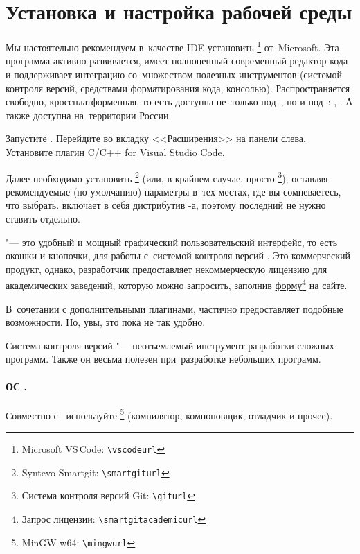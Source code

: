 \section{Установка и настройка рабочей среды}\label{sect:workEnv}
Мы настоятельно рекомендуем в~качестве IDE установить \href{\vscodeurl}{}\footnote{\textenglish{Microsoft VS\,Code:} \nolinkurl{\vscodeurl}} от~Microsoft. Эта программа активно развивается, имеет полноценный современный редактор кода и поддерживает интеграцию со~множеством полезных инструментов (системой контроля версий, средствами форматирования кода, консолью). Распространяется свободно, кроссплатформенная, то есть доступна не~только под~, но и под~: , . А также доступна на~территории России.

Запустите . Перейдите во вкладку <<Расширения>> на панели слева. Установите плагин \textenglish{C/C++ for Visual Studio Code}.

Далее необходимо установить \href{\smartgiturl}{}\footnote{Syntevo Smartgit: \nolinkurl{\smartgiturl}} (или, в крайнем случае, просто \href{\giturl}{\git}\footnote{Система контроля версий Git: \nolinkurl{\giturl}}), оставляя рекомендуемые (по умолчанию) параметры в~тех местах, где вы сомневаетесь, что выбрать.  включает в себя дистрибутив \git-а, поэтому последний не нужно ставить отдельно.

 "--- это удобный и мощный графический пользовательский интерфейс, то есть окошки и кнопочки, для работы с~системой контроля версий \git. Это коммерческий продукт, однако, разработчик предоставляет некоммерческую лицензию для академических заведений, которую можно запросить, заполнив \href{\smartgitacademicurl}{форму}\footnote{Запрос лицензии: \nolinkurl{\smartgitacademicurl}} на сайте.

В~сочетании с дополнительными плагинами,  частично предоставляет подобные возможности. Но, увы, это пока не так удобно.

Система контроля версий "--- неотъемлемый инструмент разработки сложных программ. Также он весьма полезен при~разработке небольших программ.



\paragraph{ОС .}
Совместно с~ используйте \href{\mingwurl}{}\footnote{MinGW-w64: \nolinkurl{\mingwurl}} (компилятор, компоновщик, отладчик и прочее).

